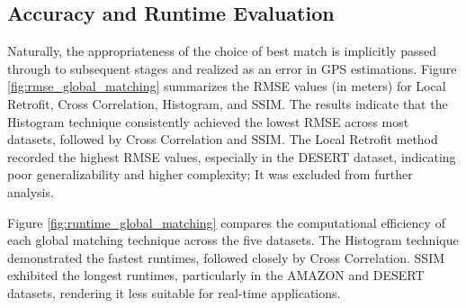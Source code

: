 \subsection{Accuracy and Runtime Evaluation}

Naturally, the appropriateness of the choice of best match is implicitly passed through to subsequent stages and realized as an error in GPS estimations. Figure \ref{fig:rmse_global_matching} summarizes the RMSE values (in meters) for Local Retrofit, Cross Correlation, Histogram, and SSIM. The results indicate that the Histogram technique consistently achieved the lowest RMSE across most datasets, followed by Cross Correlation and SSIM. The Local Retrofit method recorded the highest RMSE values, especially in the DESERT dataset, indicating poor generalizability and higher complexity; It was excluded from further analysis.

Figure \ref{fig:runtime_global_matching} compares the computational efficiency of each global matching technique across the five datasets. The Histogram technique demonstrated the fastest runtimes, followed closely by Cross Correlation. SSIM exhibited the longest runtimes, particularly in the AMAZON and DESERT datasets, rendering it less suitable for real-time applications.


